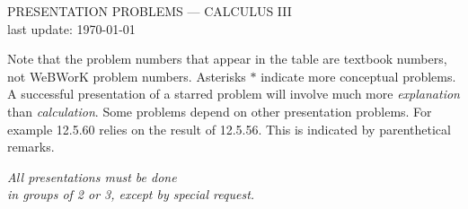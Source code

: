 \documentclass[12pt]{amsart}
\begin{document}
\thispagestyle{empty}
\begin{center}
    PRESENTATION PROBLEMS --- CALCULUS III \\ last update: \today
\end{center}

Note that the problem numbers that appear in the table are textbook numbers, 
not WeBWorK problem numbers. Asterisks $\ast$ indicate more conceptual 
problems. A successful presentation of a starred problem will involve much
more \emph{explanation} than \emph{calculation}. Some problems depend 
on other presentation problems. For example 12.5.60 relies on the result of 
12.5.56. This is indicated by parenthetical remarks.

\begin{center}
    {\large \emph{All presentations must be done\\ in groups of 2 or 3, except by special request.}}
\end{center}
\end{document}

